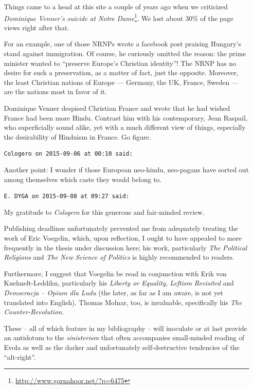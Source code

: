 \begin{footnotesize}
\begin{sffamily}
Things came to a head at this site a couple of years ago when we criticized \textit{Dominique Venner's suicide at Notre Dame}\footnote{\url{http://www.gornahoor.net/?p=6475}}. We lost about 30\% of the page views right after that.

For an example, one of those NRNPs wrote a facebook post praising Hungary's stand against immigration. Of course, he curiously omitted the reason: the prime minister wanted to ``preserve Europe's Christian identity''! The NRNP has no desire for such a preservation, as a matter of fact, just the opposite. Moreover, the least Christian nations of Europe --- Germany, the UK, France, Sweden --- are the nations most in favor of it.

Dominique Venner despised Christian France and wrote that he had wished France had been more Hindu. Contrast him with his contemporary, Jean Raspail, who superficially sound alike, yet with a much different view of things, especially the desirability of Hinduism in France. Go figure.

\hfill

\texttt{Cologero on 2015-09-06 at 00:10 said:}

Another point: I wonder if those European neo-hindu, neo-pagans have sorted out among themselves which caste they would belong to.

\hfill

\texttt{E. DYGA on 2015-09-08 at 09:27 said:}

My gratitude to \emph{Cologero} for this generous and fair-minded review.

Publishing deadlines unfortunately prevented me from adequately treating the work of Eric Voegelin, which, upon reflection, I ought to have appealed to more frequently in the thesis under discussion here; his work, particularly \emph{The Political Religions} and \emph{The New Science of Politics} is highly recommended to readers.

Furthermore, I suggest that Voegelin be read in conjunction with Erik von Kuehnelt-Leddihn, particularly his \emph{Liberty or Equality}, \emph{Leftism Revisited} and \emph{Democracja -- Opium dla Ludu} (the later, as far as I am aware, is not yet translated into English). Thomas Molnar, too, is invaluable, specifically his \emph{The Counter-Revolution}.

These -- all of which feature in my bibliography -- will inoculate or at last provide an antidotum to the \emph{sinisterism} that often accompanies small-minded reading of Evola as well as the darker and unfortunately self-destructive tendencies of the ``alt-right''.


\end{sffamily}
\end{footnotesize}
